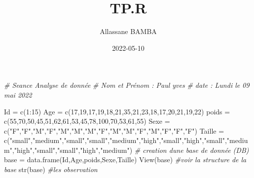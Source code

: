 \documentclass[
]{article}
\title{TP.R}
\author{Allassane BAMBA}
\date{2022-05-10}
\newenvironment{Shaded}{\begin{snugshade}}{\end{snugshade}}
\newcommand{\CommentTok}[1]{\textcolor[rgb]{0.56,0.35,0.01}{\textit{#1}}}
\newcommand{\DecValTok}[1]{\textcolor[rgb]{0.00,0.00,0.81}{#1}}
\newcommand{\FunctionTok}[1]{\textcolor[rgb]{0.00,0.00,0.00}{#1}}
\newcommand{\NormalTok}[1]{#1}
\newcommand{\OtherTok}[1]{\textcolor[rgb]{0.56,0.35,0.01}{#1}}
\newcommand{\SpecialCharTok}[1]{\textcolor[rgb]{0.00,0.00,0.00}{#1}}
\newcommand{\StringTok}[1]{\textcolor[rgb]{0.31,0.60,0.02}{#1}}
\begin{document}
\maketitle

\begin{Shaded}
\begin{Highlighting}[]
\CommentTok{\# Seance Analyse de donnée }
\CommentTok{\# Nom et Prénom : Paul yves}
\CommentTok{\# date : Lundi le 09 mai 2022}

\NormalTok{Id }\OtherTok{=} \FunctionTok{c}\NormalTok{(}\DecValTok{1}\SpecialCharTok{:}\DecValTok{15}\NormalTok{)}
\NormalTok{Age }\OtherTok{=} \FunctionTok{c}\NormalTok{(}\DecValTok{17}\NormalTok{,}\DecValTok{19}\NormalTok{,}\DecValTok{17}\NormalTok{,}\DecValTok{19}\NormalTok{,}\DecValTok{18}\NormalTok{,}\DecValTok{21}\NormalTok{,}\DecValTok{35}\NormalTok{,}\DecValTok{21}\NormalTok{,}\DecValTok{23}\NormalTok{,}\DecValTok{18}\NormalTok{,}\DecValTok{17}\NormalTok{,}\DecValTok{20}\NormalTok{,}\DecValTok{21}\NormalTok{,}\DecValTok{19}\NormalTok{,}\DecValTok{22}\NormalTok{)}
\NormalTok{poids }\OtherTok{=} \FunctionTok{c}\NormalTok{(}\DecValTok{55}\NormalTok{,}\DecValTok{70}\NormalTok{,}\DecValTok{50}\NormalTok{,}\DecValTok{45}\NormalTok{,}\DecValTok{51}\NormalTok{,}\DecValTok{62}\NormalTok{,}\DecValTok{61}\NormalTok{,}\DecValTok{53}\NormalTok{,}\DecValTok{45}\NormalTok{,}\DecValTok{78}\NormalTok{,}\DecValTok{100}\NormalTok{,}\DecValTok{70}\NormalTok{,}\DecValTok{53}\NormalTok{,}\DecValTok{61}\NormalTok{,}\DecValTok{55}\NormalTok{)}
\NormalTok{Sexe }\OtherTok{=} \FunctionTok{c}\NormalTok{(}\StringTok{"F"}\NormalTok{,}\StringTok{"F"}\NormalTok{,}\StringTok{"M"}\NormalTok{,}\StringTok{"F"}\NormalTok{,}\StringTok{"M"}\NormalTok{,}\StringTok{"M"}\NormalTok{,}\StringTok{"M"}\NormalTok{,}\StringTok{"F"}\NormalTok{,}\StringTok{"M"}\NormalTok{,}\StringTok{"M"}\NormalTok{,}\StringTok{"F"}\NormalTok{,}\StringTok{"M"}\NormalTok{,}\StringTok{"F"}\NormalTok{,}\StringTok{"F"}\NormalTok{,}\StringTok{"F"}\NormalTok{)}
\NormalTok{Taille }\OtherTok{=} \FunctionTok{c}\NormalTok{(}\StringTok{"small"}\NormalTok{,}\StringTok{"medium"}\NormalTok{,}\StringTok{"small"}\NormalTok{,}\StringTok{"small"}\NormalTok{,}\StringTok{"medium"}\NormalTok{,}\StringTok{"high"}\NormalTok{,}\StringTok{"small"}\NormalTok{,}\StringTok{"high"}\NormalTok{,}\StringTok{"small"}\NormalTok{,}\StringTok{"medium"}\NormalTok{,}\StringTok{"high"}\NormalTok{,}\StringTok{"small"}\NormalTok{,}\StringTok{"small"}\NormalTok{,}\StringTok{"high"}\NormalTok{,}\StringTok{"medium"}\NormalTok{)}
\CommentTok{\# creation d\textquotesingle{}une base de donnée (DB)}
\NormalTok{base }\OtherTok{=} \FunctionTok{data.frame}\NormalTok{(Id,Age,poids,Sexe,Taille)}
\FunctionTok{View}\NormalTok{(base)}
\CommentTok{\#voir la structure de la base }
\FunctionTok{str}\NormalTok{(base) }\CommentTok{\#les observation}
\end{Highlighting}
\end{Shaded}
\end{document}

